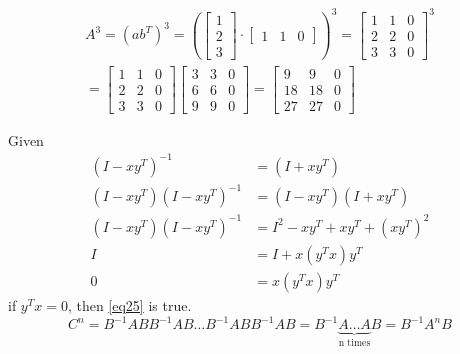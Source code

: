 \documentclass[11pt]{homework}
\begin{document}
    \question
    \begin{multline}
        A^3=(ab^T)^3=
        (\begin{bmatrix}
        1 \\ 
        2 \\ 
        3
        \end{bmatrix}
        \cdot
        \left[\begin{array}{ccc}
        1 & 1 & 0
        \end{array}\right]
        )^3=
        \left[\begin{array}{ccc}
        1 & 1 & 0 \\ 
        2 & 2 & 0 \\ 
        3 & 3 & 0
        \end{array}\right]^3\\
        =
        \left[\begin{array}{ccc}
        1 & 1 & 0 \\ 
        2 & 2 & 0 \\ 
        3 & 3 & 0
        \end{array}\right]
        \left[\begin{array}{ccc}
        3 & 3 & 0 \\ 
        6 & 6 & 0 \\ 
        9 & 9 & 0
        \end{array}\right]=
        \left[\begin{array}{ccc}
        9 & 9 & 0 \\ 
        18 & 18 & 0 \\ 
        27 & 27 & 0
        \end{array}\right]
    \end{multline}
    
    
    \question
    Given
    \begin{align}
        (I-xy^T)^{-1}&=(I+xy^T)\\
        (I-xy^T)(I-xy^T)^{-1}&=(I-xy^T)(I+xy^T)\\
        (I-xy^T)(I-xy^T)^{-1}&=I^2-xy^T+xy^T+(xy^T)^2\\
        I&=I+x(y^Tx)y^T\\
        0&=x(y^Tx)y^T\label{eq25}
    \end{align}
    if $y^Tx=0$, then \cref{eq25} is true. 
    \question
    \begin{equation}
        C^n=B^{-1}ABB^{-1}AB\dots B^{-1}ABB^{-1}AB=B^{-1}\underbrace{A\dots A}_{\text{n times}}B=B^{-1}A^nB
    \end{equation}
\end{document}
